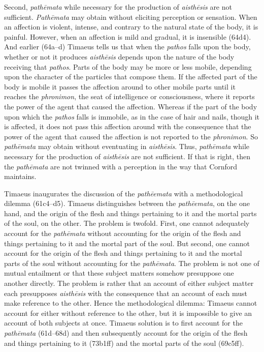Second, \emph{pathēmata} while necessary for the production of \emph{aisthēsis} are not sufficient. \emph{Pathēmata} may obtain without eliciting perception or sensation. When an affection is violent, intense, and contrary to the natural state of the body, it is painful. However, when an affection is mild and gradual, it is insensible (64d4). And earlier (64a--d) Timaeus tells us that when the \emph{pathos} falls upon the body, whether or not it produces \emph{aisthēsis} depends upon the nature of the body receiving that \emph{pathos}. Parts of the body may be more or less mobile, depending upon the character of the particles that compose them. If the affected part of the body is mobile it passes the affection around to other mobile parts until it reaches the \emph{phronimon}, the seat of intelligence or consciousness, where it reports the power of the agent that caused the affection. Whereas if the part of the body upon which the \emph{pathos} falls is immobile, as in the case of hair and nails, though it is affected, it does not pass this affection around with the consequence that the power of the agent that caused the affection is not reported to the \emph{phronimon}. So \emph{pathēmata} may obtain without eventuating in \emph{aisthēsis}. Thus, \emph{pathēmata} while necessary for the production of \emph{aisthēsis} are not sufficient. If that is right, then the \emph{pathēmata} are not twinned with a perception in the way that Cornford maintains.

Timaeus inaugurates the discussion of the \emph{pathēemata} with a methodological dilemma (61c4--d5). Timaeus distinguishes between the \emph{pathēemata}, on the one hand, and the origin of the flesh and things pertaining to it and the mortal parts of the soul, on the other. The problem is twofold. First, one cannot adequately account for the \emph{pathēmata} without accounting for the origin of the flesh and things pertaining to it and the mortal part of the soul. But second, one cannot account for the origin of the flesh and things pertaining to it and the mortal parts of the soul without accounting for the \emph{pathēmata}. The problem is not one of mutual entailment or that these subject matters somehow presuppose one another directly. The problem is rather that an account of either subject matter each presupposes \emph{aisthēsis} with the consequence that an account of each must make reference to the other. Hence the methodological dilemma: Timaeus cannot account for either without reference to the other, but it is impossible to give an account of both subjects at once. Timaeus solution is to first account for the \emph{pathēmata} (61d--68d) and then subsequently account for the origin of the flesh and things pertaining to it (73b1ff) and the mortal parts of the soul (69c5ff).

